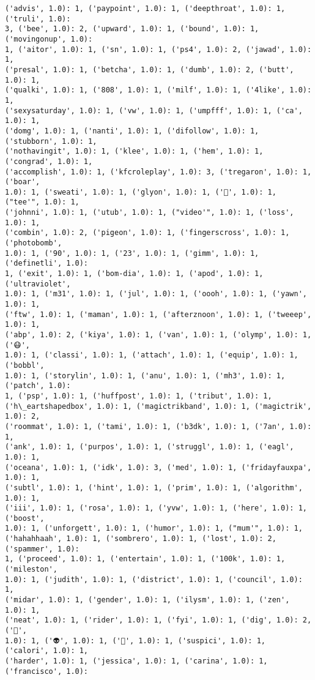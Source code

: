 \documentclass[11pt]{article}
\begin{document}
\begin{Verbatim}[commandchars=\\\{\}]
('advis', 1.0): 1, ('paypoint', 1.0): 1, ('deepthroat', 1.0): 1, ('truli', 1.0):
3, ('bee', 1.0): 2, ('upward', 1.0): 1, ('bound', 1.0): 1, ('movingonup', 1.0):
1, ('aitor', 1.0): 1, ('sn', 1.0): 1, ('ps4', 1.0): 2, ('jawad', 1.0): 1,
('presal', 1.0): 1, ('betcha', 1.0): 1, ('dumb', 1.0): 2, ('butt', 1.0): 1,
('qualki', 1.0): 1, ('808', 1.0): 1, ('milf', 1.0): 1, ('4like', 1.0): 1,
('sexysaturday', 1.0): 1, ('vw', 1.0): 1, ('umpfff', 1.0): 1, ('ca', 1.0): 1,
('domg', 1.0): 1, ('nanti', 1.0): 1, ('difollow', 1.0): 1, ('stubborn', 1.0): 1,
('nothavingit', 1.0): 1, ('klee', 1.0): 1, ('hem', 1.0): 1, ('congrad', 1.0): 1,
('accomplish', 1.0): 1, ('kfcroleplay', 1.0): 3, ('tregaron', 1.0): 1, ('boar',
1.0): 1, ('sweati', 1.0): 1, ('glyon', 1.0): 1, ('🚮', 1.0): 1, ("tee'", 1.0): 1,
('johnni', 1.0): 1, ('utub', 1.0): 1, ("video'", 1.0): 1, ('loss', 1.0): 1,
('combin', 1.0): 2, ('pigeon', 1.0): 1, ('fingerscross', 1.0): 1, ('photobomb',
1.0): 1, ('90', 1.0): 1, ('23', 1.0): 1, ('gimm', 1.0): 1, ('definetli', 1.0):
1, ('exit', 1.0): 1, ('bom-dia', 1.0): 1, ('apod', 1.0): 1, ('ultraviolet',
1.0): 1, ('m31', 1.0): 1, ('jul', 1.0): 1, ('oooh', 1.0): 1, ('yawn', 1.0): 1,
('ftw', 1.0): 1, ('maman', 1.0): 1, ('afterznoon', 1.0): 1, ('tweeep', 1.0): 1,
('abp', 1.0): 2, ('kiya', 1.0): 1, ('van', 1.0): 1, ('olymp', 1.0): 1, ('😷',
1.0): 1, ('classi', 1.0): 1, ('attach', 1.0): 1, ('equip', 1.0): 1, ('bobbl',
1.0): 1, ('storylin', 1.0): 1, ('anu', 1.0): 1, ('mh3', 1.0): 1, ('patch', 1.0):
1, ('psp', 1.0): 1, ('huffpost', 1.0): 1, ('tribut', 1.0): 1,
('h\_eartshapedbox', 1.0): 1, ('magictrikband', 1.0): 1, ('magictrik', 1.0): 2,
('roommat', 1.0): 1, ('tami', 1.0): 1, ('b3dk', 1.0): 1, ('7an', 1.0): 1,
('ank', 1.0): 1, ('purpos', 1.0): 1, ('struggl', 1.0): 1, ('eagl', 1.0): 1,
('oceana', 1.0): 1, ('idk', 1.0): 3, ('med', 1.0): 1, ('fridayfauxpa', 1.0): 1,
('subtl', 1.0): 1, ('hint', 1.0): 1, ('prim', 1.0): 1, ('algorithm', 1.0): 1,
('iii', 1.0): 1, ('rosa', 1.0): 1, ('yvw', 1.0): 1, ('here', 1.0): 1, ('boost',
1.0): 1, ('unforgett', 1.0): 1, ('humor', 1.0): 1, ("mum'", 1.0): 1,
('hahahhaah', 1.0): 1, ('sombrero', 1.0): 1, ('lost', 1.0): 2, ('spammer', 1.0):
1, ('proceed', 1.0): 1, ('entertain', 1.0): 1, ('100k', 1.0): 1, ('mileston',
1.0): 1, ('judith', 1.0): 1, ('district', 1.0): 1, ('council', 1.0): 1,
('midar', 1.0): 1, ('gender', 1.0): 1, ('ilysm', 1.0): 1, ('zen', 1.0): 1,
('neat', 1.0): 1, ('rider', 1.0): 1, ('fyi', 1.0): 1, ('dig', 1.0): 2, ('👱',
1.0): 1, ('👽', 1.0): 1, ('🌳', 1.0): 1, ('suspici', 1.0): 1, ('calori', 1.0): 1,
('harder', 1.0): 1, ('jessica', 1.0): 1, ('carina', 1.0): 1, ('francisco', 1.0):

\end{Verbatim}
\end{document}
